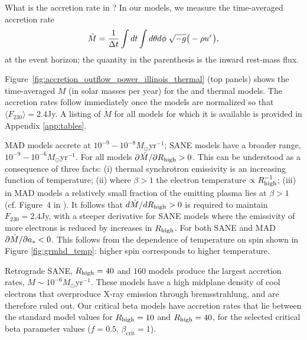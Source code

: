 What is the accretion rate in \sgra?  In our models, we measure the time-averaged accretion rate
\begin{equation}
    \dot{M} = \frac{1}{\Delta t}\int dt\int d\theta d\phi\hspace{0.1cm}\sqrt{-g}\big(-\rho u^{r}\big),
\end{equation}
at the event horizon; the quantity in the parenthesis is the inward rest-mass flux.

Figure~\ref{fig:accretion_outflow_power_illinois_thermal} (top panels) shows the time-averaged $\dot{M}$ (in solar masses per year) for the \kharma and \bhac  thermal models.  The accretion rates follow immediately once the models are normalized so that $\langle F_{230}\rangle = 2.4$Jy.  A listing of $\dot{M}$ for all models for which it is available is provided in Appendix \ref{app:tables}.  

MAD models accrete at $10^{-9}-10^{-8} M_{\odot}$yr$^{-1}$; SANE models have a broader range, $10^{-9}-10^{-6} M_{\odot}$yr$^{-1}$.  For all models  $\partial\dot{M}/\partial R_\mathrm{high} > 0$.  This can be understood as a consequence of three facts: (i) thermal synchrotron emissivity is an increasing function of temperature; (ii) where $\beta > 1$ the electron temperature $\propto R_\mathrm{high}^{-1}$; (iii) in MAD models a relatively small fraction of the emitting plasma lies at $\beta > 1$ (cf. Figure~4 in ).  It follows that $d\dot{M}/dR_\mathrm{high} > 0$ is required to maintain $F_{230} = 2.4$Jy, with a steeper derivative for SANE models where the emissivity of more electrons is reduced by increases in $R_\mathrm{high}$.  For both SANE and MAD $\partial\dot{M}/\partial a_* < 0$.  This follows from the dependence of temperature on spin shown in Figure \ref{fig:grmhd_temp}: higher spin corresponds to higher temperature.   

Retrograde SANE, $R_\mathrm{high}=40$ and $160$ models produce the largest accretion rates, $\dot{M}\sim 10^{-6}M_{\odot}$yr$^{-1}$.  These models have a high midplane density of cool electrons that overproduce X-ray emission through bremsstrahlung, and are therefore ruled out.   Our critical beta models have accretion rates that lie between the standard model values for $R_\mathrm{high} = 10$ and $R_\mathrm{high} = 40$, for the selected critical beta parameter values ($f=0.5$, $\beta_\mathrm{crit}=1$).

